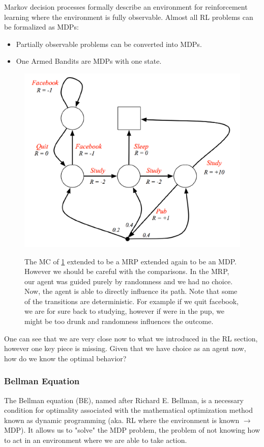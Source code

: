 \documentclass[main]{subfiles}
\begin{document}
Markov decision processes formally describe an environment for reinforcement learning where the environment is fully observable.
Almost all RL problems can be formalized as MDPs:

\begin{itemize}
    \item Partially observable problems can be converted into MDPs.
    \item One Armed Bandits are MDPs with one state.
\end{itemize}

\begin{figure}[H]
	\centering
	\includegraphics[width=0.9\linewidth]{08_ReinforcementLearning/figures/mdp-example.png}
	\label{fig:mrp-example}
	\caption{The MC of \cref{fig:mrp-example} extended to be a MRP extended again to be an MDP. However we should be careful with the comparisons. In the MRP, our agent was guided purely by randomness and we had no choice. Now, the agent is able to directly influence its path. Note that some of the transitions are deterministic. For example if we quit facebook, we are for sure back to studying, however if were in the pup, we might be too drunk and randomness influences the outcome.}
\end{figure}

One can see that we are very close now to what we introduced in the RL section, however one key piece is missing.  Given that we have choice as an agent now, how do we know the optimal behavior?

\subsubsection{Bellman Equation}
The Bellman equation (BE), named after Richard E. Bellman, is a necessary condition for optimality associated with the mathematical optimization method known as dynamic programming (aka. RL where the environment is known $\longrightarrow$ MDP). It allows us to "solve" the MDP problem, the problem of not knowing how to act in an environment where we are able to take action.
\end{document}
